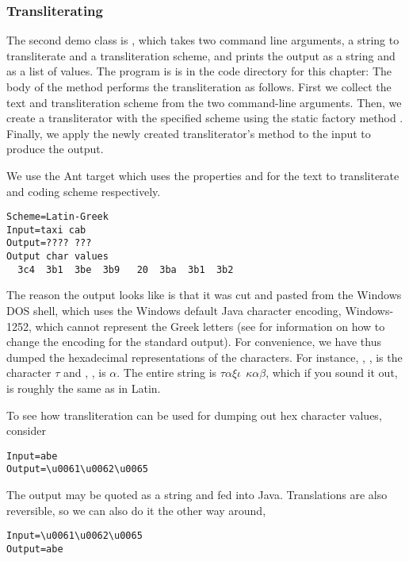 \subsubsection{Transliterating}

The second demo class is , which takes two command
line arguments, a string to transliterate and a transliteration
scheme, and prints the output as a string and as a list of 
values.
The program is is in the code directory for this chapter:
%
%
The body of the  method performs the
transliteration as follows.
%
%
First we collect the text and transliteration scheme from the two
command-line arguments.  Then, we create a transliterator with the
specified scheme using the static factory method .
Finally, we apply the newly created transliterator's
 method to the input to produce the output.

We use the Ant target  which uses the properties
 and  for the text to transliterate and coding
scheme respectively.  
%
\begin{verbatim}
Scheme=Latin-Greek
Input=taxi cab
Output=???? ???
Output char values
  3c4  3b1  3be  3b9   20  3ba  3b1  3b2
\end{verbatim}
%
The reason the output looks like  is that it was cut
and pasted from the Windows DOS shell, which uses the Windows default
Java character encoding, Windows-1252, which cannot represent the
Greek letters (see  for information on how to
change the encoding for the standard output).  For convenience, we
have thus dumped the hexadecimal representations of the characters.
For instance, ,
, is the 
character $\tau$ and , , is $\alpha$.  The entire string is $\tau\alpha\xi\iota \ \
\kappa\alpha\beta$, which if you sound it out, is roughly
the same as  in Latin.

To see how transliteration can be used for dumping out
hex character values, consider
%
\begin{verbatim}
Input=abe
Output=\u0061\u0062\u0065
\end{verbatim}
%
The output may be quoted as a string and fed into Java.  Translations
are also reversible, so we can also do it the other way around,
%
\begin{verbatim}
Input=\u0061\u0062\u0065
Output=abe
\end{verbatim}

